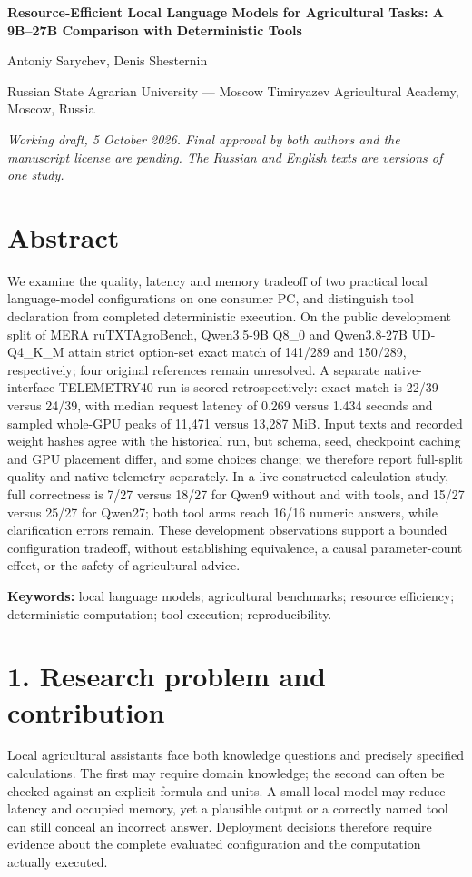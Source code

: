 \documentclass[10pt,a4paper]{article}
\begin{document}
\begin{center}\bfseries\large Resource-Efficient Local Language Models for Agricultural Tasks: A 9B–27B Comparison with Deterministic Tools\end{center}
\begin{center}Antoniy Sarychev, Denis Shesternin\end{center}
\begin{center}Russian State Agrarian University — Moscow Timiryazev Agricultural Academy, Moscow, Russia\end{center}
\begin{center}\emph{Working draft, 5 October 2026. Final approval by both authors and the manuscript license are pending. The Russian and English texts are versions of one study.}\end{center}
\section*{Abstract}
We examine the quality, latency and memory tradeoff of two practical local language-model configurations on one consumer PC, and distinguish tool declaration from completed deterministic execution. On the public development split of MERA ruTXTAgroBench, Qwen3.5-9B Q8\_0 and Qwen3.8-27B UD-Q4\_K\_M attain strict option-set exact match of 141/289 and 150/289, respectively; four original references remain unresolved. A separate native-interface TELEMETRY40 run is scored retrospectively: exact match is 22/39 versus 24/39, with median request latency of 0.269 versus 1.434 seconds and sampled whole-GPU peaks of 11,471 versus 13,287 MiB. Input texts and recorded weight hashes agree with the historical run, but schema, seed, checkpoint caching and GPU placement differ, and some choices change; we therefore report full-split quality and native telemetry separately. In a live constructed calculation study, full correctness is 7/27 versus 18/27 for Qwen9 without and with tools, and 15/27 versus 25/27 for Qwen27; both tool arms reach 16/16 numeric answers, while clarification errors remain. These development observations support a bounded configuration tradeoff, without establishing equivalence, a causal parameter-count effect, or the safety of agricultural advice.

\textbf{Keywords:} local language models; agricultural benchmarks; resource efficiency; deterministic computation; tool execution; reproducibility.

\section*{1. Research problem and contribution}
Local agricultural assistants face both knowledge questions and precisely specified calculations. The first may require domain knowledge; the second can often be checked against an explicit formula and units. A small local model may reduce latency and occupied memory, yet a plausible output or a correctly named tool can still conceal an incorrect answer. Deployment decisions therefore require evidence about the complete evaluated configuration and the computation actually executed.
\end{document}
